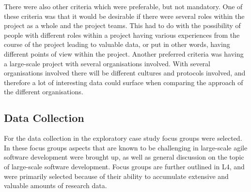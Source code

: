 There were also other criteria which were preferable, but not mandatory. One of these criteria was that it would be desirable if there were several roles within
 the project as a whole and the project teams. This had to do with the possibility of people with different roles within a project having various experiences from the course of the project leading to valuable data, or put in other words, having different points of view within the project. Another preferred criteria was having a large-scale project with several organisations involved. With several organisations involved there will be different cultures and protocols involved, and therefore a lot of interesting data could surface when comparing the approach of the different organisations.

\subsection{Data Collection}

For the data collection in the exploratory case study focus groups were selected. In these focus groups aspects that are known to be challenging in large-scale agile software development were brought up, as well as general discussion on the topic of large-scale software development. Focus groups are further outlined in L4, and were primarily selected because of their ability to accumulate extensive and valuable amounts of research data.

\vspace{0.5cm}

